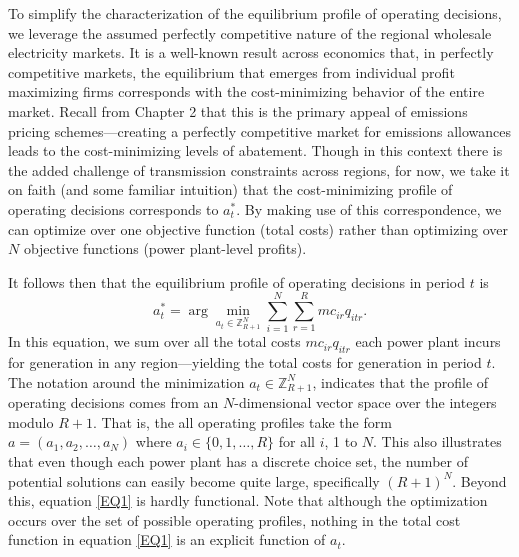 To simplify the characterization of the equilibrium profile of operating decisions, we leverage the assumed perfectly competitive nature of the regional wholesale electricity markets. It is a well-known result across economics that, in perfectly competitive markets, the equilibrium that emerges from individual  profit maximizing firms corresponds with the cost-minimizing behavior of the entire market. Recall from Chapter 2 that this is the primary appeal of emissions pricing schemes---creating a perfectly competitive market for emissions allowances leads to the cost-minimizing levels of abatement. Though in this context there is the added challenge of transmission constraints across regions, for now, we take it on faith (and some familiar intuition) that the cost-minimizing profile of operating decisions corresponds to $a_t^*$. By making use of this correspondence, we can optimize over one objective function (total costs) rather than optimizing over $N$ objective functions (power plant-level profits). 

It follows then that the equilibrium profile of operating decisions in period $t$ is
\begin{equation}\label{EQ1}
    a_t^* = \arg\min_{a_t \in \mathbb{Z}_{R + 1}^N} \sum_{i = 1}^N \sum_{r = 1}^R mc_{ir} q_{itr}.
\end{equation}
In this equation, we sum over all the total costs $mc_{ir} q_{itr}$ each power plant incurs for generation in any region---yielding the total costs for generation in period $t$. The notation around the minimization $a_t \in \mathbb{Z}_{R + 1}^N$, indicates that the profile of operating decisions comes from an $N$-dimensional vector space over the integers modulo $R +1$. That is, the all operating profiles take the form $a = (a_{1}, a_2, \ldots, a_N)$ where $a_i \in \{0, 1, \ldots, R\}$ for all $i$, 1 to $N$. This also illustrates that even though each power plant has a discrete choice set, the number of potential solutions can easily become quite large, specifically $(R + 1)^N$. Beyond this, equation \eqref{EQ1} is hardly functional. Note that although the optimization occurs over the set of possible operating profiles, nothing in the total cost function in equation \eqref{EQ1} is an explicit function of $a_{t}$. 

